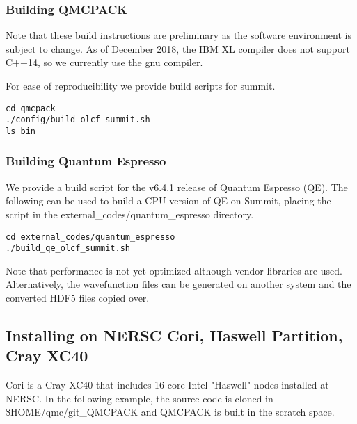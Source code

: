 \subsubsection{Building QMCPACK}
Note that these build instructions are preliminary as the
software environment is subject to change. As of December 2018, the
IBM XL compiler does not support C++14, so we currently use the
gnu compiler. 

For ease of reproducibility we provide build scripts for summit.
\lstset{language=bash,style=SHELL}
\begin{lstlisting}
cd qmcpack
./config/build_olcf_summit.sh
ls bin
\end{lstlisting}

\subsubsection{Building Quantum Espresso}
We provide a build script for the v6.4.1 release of Quantum Espresso (QE).
The following can be used to build a CPU version of QE on Summit,
placing the script in the external\_codes/quantum\_espresso directory.

\begin{lstlisting}
cd external_codes/quantum_espresso
./build_qe_olcf_summit.sh
\end{lstlisting}

Note that performance is
not yet optimized although vendor libraries are
used. Alternatively, the wavefunction files can be generated on
another system and the converted HDF5 files copied over.

\subsection{Installing on NERSC Cori, Haswell Partition, Cray XC40}
Cori is a Cray XC40 that includes 16-core Intel "Haswell" nodes
installed at NERSC. In the following example, the source code is
cloned in \$HOME/qmc/git\_QMCPACK and QMCPACK is built in the scratch
space.


